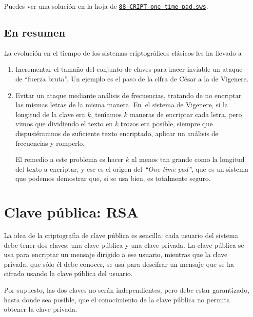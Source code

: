  Puedes ver una soluci\'on en la hoja de {\sage} 
 \href{http://sage.mat.uam.es:8888/home/pub/??/}{\tt 88-CRIPT-one-time-pad.sws}.
 
 \subsection{En resumen}
 
 La evoluci\'on en el tiempo de los sistemas criptogr\'aficos cl\'asicos les ha
llevado a
 \begin{enumerate}
  \item Incrementar el tama\~no del conjunto de claves para
hacer inviable un ataque de ``fuerza bruta''. Un ejemplo es el paso de la cifra
de C\'esar a la  de Vigenere. 

\item Evitar un ataque mediante an\'alisis de frecuencias, tratando de no
encriptar las mismas letras de la misma manera.  En~el sistema de  Vigenere, si
la longitud de la clave era $k$, ten\'{\i}amos $k$ maneras de encriptar cada
letra,  pero vimos que dividiendo el texto en $k$ trozos era posible, siempre
que dispusi\'eramnos de suficiente texto encriptado,  aplicar un an\'alisis de
frecuencias y romperlo.

El remedio a este problema es hacer $k$ al menos tan grande como la longitud del
texto a encriptar, y ese es el origen del {\itshape ``One time pad''}, que es
un sistema que podemos demostrar que, si se usa bien,  es totalmente seguro. 
\end{enumerate}





\section{Clave p\'ublica: RSA}

La idea de la criptograf\'{\i}a de clave p\'ublica es sencilla: cada usuario del
sistema debe tener dos claves: una clave p\'ublica y una clave privada. La clave
p\'ublica se usa para encriptar un mensaje dirigido a ese usuario, mientras que
la clave privada, que s\'olo \'el debe conocer, se usa para descifrar un mensaje
que se ha cifrado usando la clave p\'ublica del usuario.  

Por supuesto, las dos claves no ser\'an independientes, pero debe estar
garantizado, hasta donde sea posible, que el conocimiento de la clave p\'ublica
{\sc no} permita obtener la clave privada. 




